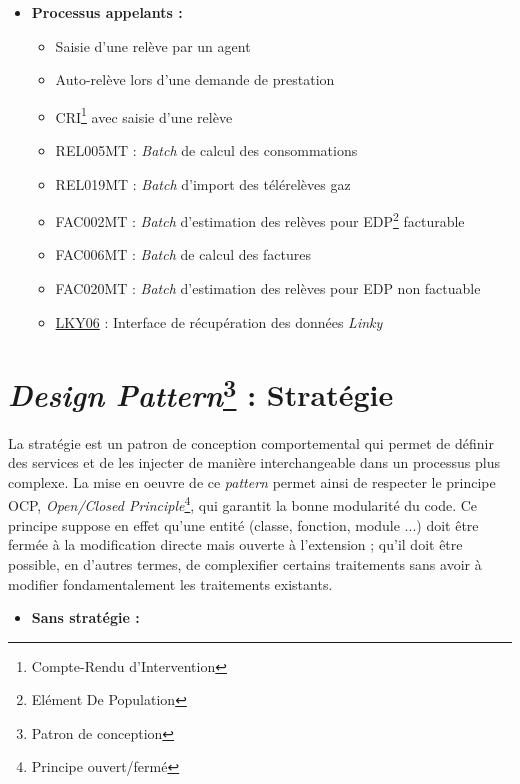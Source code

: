 \documentclass[a4paper, 12pt]{report}
\begin{document}
\begin{itemize}
  \item \textbf{Processus appelants :}\\
  \begin{itemize}
    \item Saisie d'une relève par un agent
    \item Auto-relève lors d'une demande de prestation
    \item CRI\footnote{Compte-Rendu d'Intervention} avec saisie d'une relève
    \item REL005MT : \textit{Batch} de calcul des consommations
    \item REL019MT : \textit{Batch} d'import des télérelèves gaz
    \item FAC002MT : \textit{Batch} d'estimation des relèves pour EDP\footnote{Elément De Population} facturable
    \item FAC006MT : \textit{Batch} de calcul des factures
    \item FAC020MT : \textit{Batch} d'estimation des relèves pour EDP non factuable
    \item \underline{LKY06} : Interface de récupération des données \textit{Linky}
  \end{itemize}
\end{itemize}

\chapter{\textit{Design Pattern}\footnote{Patron de conception} : Stratégie}
\label{appendix:strategy}

La stratégie est un patron de conception comportemental qui permet de définir des services et de les injecter de manière interchangeable dans un processus plus complexe. La mise en oeuvre de ce \textit{pattern} permet ainsi de respecter le principe OCP, \textit{Open/Closed Principle}\footnote{Principe ouvert/fermé}, qui garantit la bonne modularité du code. Ce principe suppose en effet qu'une entité (classe, fonction, module ...) doit être fermée à la modification directe mais ouverte à l'extension ; qu'il doit être possible, en d'autres termes, de complexifier certains traitements sans avoir à modifier fondamentalement les traitements existants.\\

\begin{itemize}
  \item \textbf{Sans stratégie :}\\
\end{itemize}
\end{document}
